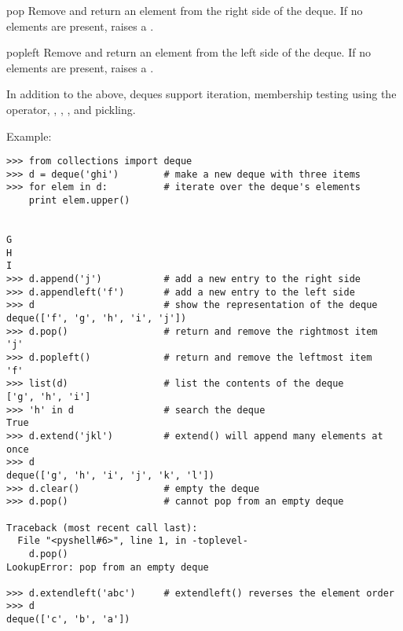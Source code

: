 \begin{methoddesc}{pop}{}
   Remove and return an element from the right side of the deque.
   If no elements are present, raises a .
\end{methoddesc}

\begin{methoddesc}{popleft}{}
   Remove and return an element from the left side of the deque.
   If no elements are present, raises a .   
\end{methoddesc}

In addition to the above, deques support iteration, membership testing
using the  operator, , ,
, and pickling.

Example:

\begin{verbatim}
>>> from collections import deque
>>> d = deque('ghi')        # make a new deque with three items
>>> for elem in d:          # iterate over the deque's elements
	print elem.upper()

	
G
H
I
>>> d.append('j')           # add a new entry to the right side
>>> d.appendleft('f')       # add a new entry to the left side
>>> d                       # show the representation of the deque
deque(['f', 'g', 'h', 'i', 'j'])
>>> d.pop()                 # return and remove the rightmost item
'j'
>>> d.popleft()             # return and remove the leftmost item
'f'
>>> list(d)                 # list the contents of the deque
['g', 'h', 'i']
>>> 'h' in d                # search the deque
True
>>> d.extend('jkl')         # extend() will append many elements at once
>>> d
deque(['g', 'h', 'i', 'j', 'k', 'l'])
>>> d.clear()               # empty the deque
>>> d.pop()                 # cannot pop from an empty deque

Traceback (most recent call last):
  File "<pyshell#6>", line 1, in -toplevel-
    d.pop()
LookupError: pop from an empty deque

>>> d.extendleft('abc')     # extendleft() reverses the element order
>>> d
deque(['c', 'b', 'a'])

\end{verbatim}    
